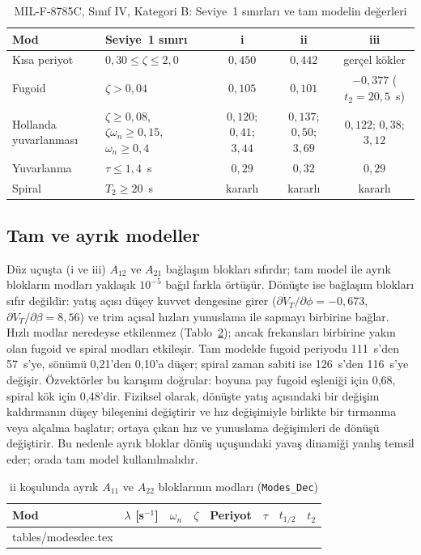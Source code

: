 \documentclass[conf]{new-aiaa}
\makeatletter
\newcommand\tabinput[1]{\@@input #1 }
\makeatother
\begin{document}
\begin{table}[hbt!]
\caption{\label{tab:hq} MIL-F-8785C, Sınıf IV, Kategori B: Seviye~1 sınırları ve tam modelin değerleri}
\centering
\small
\begin{tabular}{llccc}
\toprule
Mod & Seviye~1 sınırı & i & ii & iii \\
\midrule
Kısa periyot & $0,30\le\zeta\le2,0$ & $0,450$ & $0,442$ & gerçel kökler \\
Fugoid & $\zeta>0,04$ & $0,105$ & $0,101$ & $-0,377$ ($t_2=20,5$~s) \\
Hollanda yuvarlanması & $\zeta\ge0,08$, $\zeta\omega_n\ge0,15$, $\omega_n\ge0,4$ & $0,120$; $0,41$; $3,44$ & $0,137$; $0,50$; $3,69$ & $0,122$; $0,38$; $3,12$ \\
Yuvarlanma & $\tau\le1,4$~s & $0,29$ & $0,32$ & $0,29$ \\
Spiral & $T_2\ge20$~s & kararlı & kararlı & kararlı \\
\bottomrule
\end{tabular}
\end{table}

\subsection{Tam ve ayrık modeller}
Düz uçuşta (i ve iii) $A_{12}$ ve $A_{21}$ bağlaşım blokları sıfırdır; tam model ile ayrık blokların modları yaklaşık $10^{-5}$ bağıl farkla örtüşür. Dönüşte ise bağlaşım blokları sıfır değildir: yatış açısı düşey kuvvet dengesine girer ($\partial\dot V_T/\partial\phi=-0,673$, $\partial\dot V_T/\partial\beta=8,56$) ve trim açısal hızları yunuslama ile sapmayı birbirine bağlar. Hızlı modlar neredeyse etkilenmez (Tablo~\ref{tab:modesdec}); ancak frekansları birbirine yakın olan fugoid ve spiral modları etkileşir. Tam modelde fugoid periyodu 111~s'den 57~s'ye, sönümü 0,21'den 0,10'a düşer; spiral zaman sabiti ise 126~s'den 116~s'ye değişir. Özvektörler bu karışımı doğrular: boyuna pay fugoid eşleniği için 0,68, spiral kök için 0,48'dir. Fiziksel olarak, dönüşte yatış açısındaki bir değişim kaldırmanın düşey bileşenini değiştirir ve hız değişimiyle birlikte bir tırmanma veya alçalma başlatır; ortaya çıkan hız ve yunuslama değişimleri de dönüşü değiştirir. Bu nedenle ayrık bloklar dönüş uçuşundaki yavaş dinamiği yanlış temsil eder; orada tam model kullanılmalıdır.

\begin{table}[hbt!]
\caption{\label{tab:modesdec} ii koşulunda ayrık $A_{11}$ ve $A_{22}$ bloklarının modları (\texttt{Modes\_Dec})}
\centering
\small
\begin{tabular}{llcccccc}
\toprule
Mod & $\lambda$ [s$^{-1}$] & $\omega_n$ & $\zeta$ & Periyot & $\tau$ & $t_{1/2}$ & $t_2$ \\
\midrule
\tabinput{tables/modesdec.tex}
\bottomrule
\end{tabular}
\end{table}
\end{document}
